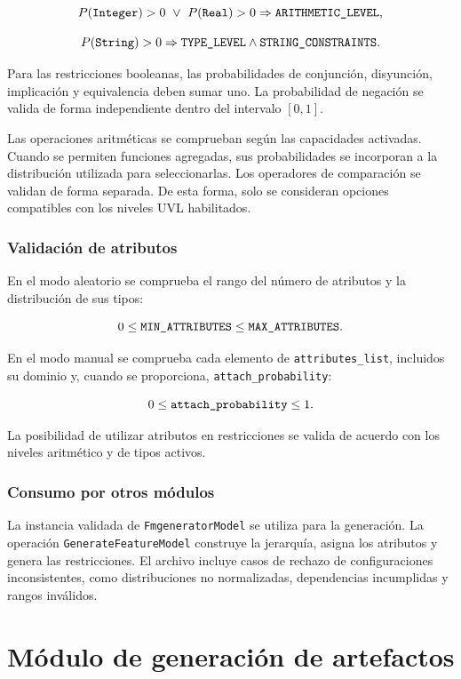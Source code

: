 \[
P(\text{\texttt{Integer}})>0\ \lor\
P(\text{\texttt{Real}})>0
\Rightarrow\text{\texttt{ARITHMETIC\_LEVEL}},
\]

\[
P(\text{\texttt{String}})>0
\Rightarrow
\text{\texttt{TYPE\_LEVEL}}\land\text{\texttt{STRING\_CONSTRAINTS}}.
\]

Para las restricciones booleanas, las probabilidades de conjunción,
disyunción, implicación y equivalencia deben sumar uno. La probabilidad de
negación se valida de forma independiente dentro del intervalo $[0,1]$.

Las operaciones aritméticas se comprueban según las capacidades activadas.
Cuando se permiten funciones agregadas, sus probabilidades se incorporan a
la distribución utilizada para seleccionarlas. Los operadores de comparación
se validan de forma separada. De esta forma, solo se consideran opciones
compatibles con los niveles UVL habilitados.

\subsubsection*{Validación de atributos}

En el modo aleatorio se comprueba el rango del número de atributos y la
distribución de sus tipos:

\[
0\leq\text{\texttt{MIN\_ATTRIBUTES}}
\leq\text{\texttt{MAX\_ATTRIBUTES}}.
\]

En el modo manual se comprueba cada elemento de
\texttt{attributes\_list}, incluidos su dominio y, cuando se proporciona,
\texttt{attach\_probability}:

\[
0\leq
\text{\texttt{attach\_probability}}
\leq 1.
\]

La posibilidad de utilizar atributos en restricciones se valida de acuerdo
con los niveles aritmético y de tipos activos.

\subsubsection{Consumo por otros módulos}

La instancia validada de \texttt{FmgeneratorModel} se utiliza para la
generación. La operación \texttt{GenerateFeatureModel} construye la
jerarquía, asigna los atributos y genera las restricciones.
El archivo  incluye casos de rechazo de
configuraciones inconsistentes, como distribuciones no normalizadas,
dependencias incumplidas y rangos inválidos.

\section{Módulo de generación de artefactos}
\label{sec:generador}

